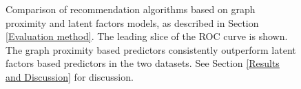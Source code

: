 \begin{figure}[h]
  \begin{center}
  \end{center}
  \caption{Comparison of recommendation algorithms based on graph proximity and latent factors models, as described in Section \ref{Evaluation method}. The leading slice of the ROC curve is shown. The graph proximity based predictors consistently outperform latent factors based predictors in the two datasets. See Section \ref{Results and Discussion} for discussion.}
  \label{fig:summaryResults}
\end{figure}


